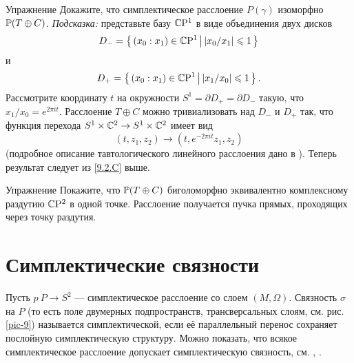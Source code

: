 \begin{ex}{Упражнение}\label{9.2.D}
Докажите, что симплектическое расслоение $P(\gamma)$ изоморфно $\mathbb{P}(T
\oplus C)$. 
\emph{Подсказка:} представьте базу $\mathbb{C}\mathrm{P}^1$ в виде объединения двух дисков
\[D_- = \left\{ \,{(x_0 : x_1 ) \in \mathbb{C}\mathrm{P}^1}\, \middle| \,{ |x_0 /x_1 | \leqslant 1}\, \right\}\]
и
\[D_+ = \left\{ \,{(x_0 : x_1 ) \in \mathbb{C}\mathrm{P}^1}\, \middle| \,{|x_1 /x_0 | \leqslant 1}\, \right\}.\]
Рассмотрите координату $t$ на окружности $S^1 = \partial D_+ =
\partial D_-$ такую, что $x_1 /x_0 = e^{2\pi it}$. 
Расслоение $T \oplus C$ можно тривиализовать над $D_-$ и $D_+$ так,
что функция перехода $S^1 \times \mathbb{C}^2 \to S^1 \times \mathbb{C}^2$ имеет вид  
\[(t, z_1, z_2 ) \to (t, e^{-2\pi it} z_1, z_2 )\]
(подробное описание тавтологического линейного расслоения дано в
\cite{GH}). 
Теперь результат следует из \ref{9.2.C} выше.
\end{ex}

\begin{ex}{Упражнение}\label{9.2.E}
Покажите, что $\mathbb{P}(T \oplus C)$ биголоморфно эквивалентно комплексному
раздутию $\mathbb{C}\mathrm{P}^2$ в одной точке. 
Расслоение получается   пучка прямых, проходящих
через точку раздутия. 
\end{ex}

\section{Симплектические связности}

Пусть $p\: P\to S^2$ --- симплектическое расслоение со слоем $(M,\Omega)$.
Связность $\sigma$ на $P$ (то есть поле двумерных подпространств,
трансверсальных слоям, см. рис. \ref{pic-9}) называется
симплектической, если её параллельный перенос сохраняет послойную
симплектическую структуру. 
Можно показать, что всякое симплектическое расслоение допускает
симплектическую связность, см. \cite{GLS}, \cite{MS}. 

